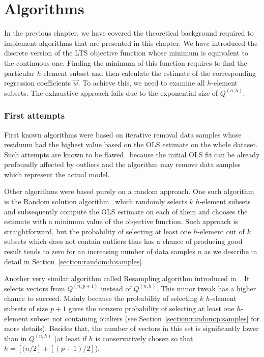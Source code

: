 \chapter{Algorithms}

In the previous chapter, we have covered the theoretical background required to implement algorithms that are presented in this chapter. We have introduced the discrete version of the LTS objective function whose minimum is equivalent to the continuous one. Finding the minimum of this function requires to find the particular $h$-element subset and then calculate the estimate of the corresponding regression coefficients $\vec{w}$. To achieve this, we need to examine all $h$-element subsets. The exhaustive approach fails due to the exponential size of $Q^{(n,h)}$.

\subsection{First attempts} \label{first:attempts}
First known algorithms were based on iterative removal data samples whose residuum had the highest value based on the OLS estimate on the whole dataset. Such attempts are known to be flawed~\cite{hawkins:1994} because the initial OLS fit can be already profoundly affected by outliers and the algorithm may remove data samples which represent the actual model.

Other algorithms were based purely on a random approach. One such algorithm is the Random solution algorithm~\cite{bai2003random} which randomly selects $k$ $h$-element subsets and subsequently compute the OLS estimate on each of them and chooses the estimate with a minimum value of the objective function.  Such approach is straightforward, but the probability of selecting at least one $h$-element out of $k$ subsets which does not contain outliers thus has a chance of producing good result tends to zero for an increasing number of data samples $n$ as we describe in detail in Section~\ref{section:random:h:samples}.

Another very similar algorithm called Resampling algorithm introduced in~\cite{rousseeuw1987robust}. It selects vectors from $Q^{(n,p+1)}$ instead of $Q^{(n, h)}$. This minor tweak has a higher chance to succeed. Mainly because the probability of selecting $k$ $h$-element subsets of size $p+1$ gives the nonzero probability of selecting at least one $h$-element subset not containing outliers (see Section~\ref{section:random:p:samples} for more details). Besides that, the number of vectors in this set is significantly lower than in $Q^{(n, h)}$ (at least if $h$ is conservatively chosen so that $h = [(n/2] + [(p+1)/2]$).
 
